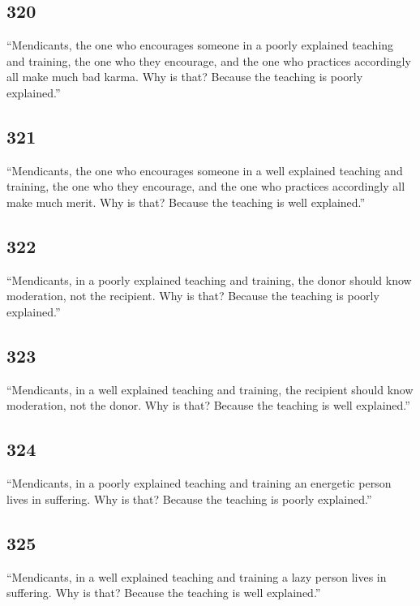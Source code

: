 \documentclass[12pt,openany]{book}%
\begin{document}
\subsection*{320 }

“Mendicants, the one who encourages someone in a poorly explained teaching and training, the one who they encourage, and the one who practices accordingly all make much bad karma. Why is that? Because the teaching is poorly explained.” 

\subsection*{321 }

“Mendicants, the one who encourages someone in a well explained teaching and training, the one who they encourage, and the one who practices accordingly all make much merit. Why is that? Because the teaching is well explained.” 

\subsection*{322 }

“Mendicants, in a poorly explained teaching and training, the donor should know moderation, not the recipient. Why is that? Because the teaching is poorly explained.” 

\subsection*{323 }

“Mendicants, in a well explained teaching and training, the recipient should know moderation, not the donor. Why is that? Because the teaching is well explained.” 

\subsection*{324 }

“Mendicants, in a poorly explained teaching and training an energetic person lives in suffering. Why is that? Because the teaching is poorly explained.” 

\subsection*{325 }

“Mendicants, in a well explained teaching and training a lazy person lives in suffering. Why is that? Because the teaching is well explained.” 
\end{document}
